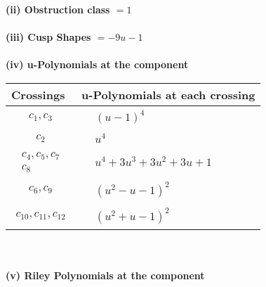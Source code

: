 \documentclass[1p]{elsarticle_modified}
\theoremstyle{definition}
\begin{document}
\flushleft \textbf{(ii) Obstruction class $= 1$}\\~\\
\flushleft \textbf{(iii) Cusp Shapes $= -9 u-1$}\\~\\
\newpage\renewcommand{\arraystretch}{1}
\flushleft \textbf{(iv) u-Polynomials at the component}\newline \\
\begin{tabular}{m{50pt}|m{274pt}}
Crossings & \hspace{64pt}u-Polynomials at each crossing \\
\hline $$\begin{aligned}c_{1},c_{3}\end{aligned}$$&$\begin{aligned}
&(u-1)^4
\end{aligned}$\\
\hline $$\begin{aligned}c_{2}\end{aligned}$$&$\begin{aligned}
&u^4
\end{aligned}$\\
\hline $$\begin{aligned}c_{4},c_{5},c_{7}\\c_{8}\end{aligned}$$&$\begin{aligned}
&u^4+3 u^3+3 u^2+3 u+1
\end{aligned}$\\
\hline $$\begin{aligned}c_{6},c_{9}\end{aligned}$$&$\begin{aligned}
&(u^2- u-1)^2
\end{aligned}$\\
\hline $$\begin{aligned}c_{10},c_{11},c_{12}\end{aligned}$$&$\begin{aligned}
&(u^2+u-1)^2
\end{aligned}$\\
\hline
\end{tabular}\\~\\
\newpage\renewcommand{\arraystretch}{1}
\flushleft \textbf{(v) Riley Polynomials at the component}\newline \\
\end{document}
